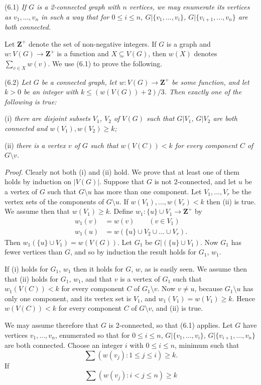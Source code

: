 \stmt
(6.1) \textit{If $G$ is a 2-connected graph with $n$ vertices, we may enumerate its vertices as $v_1, ..., v_n$ in such a way that for $0 \le i \le n$, $G|\{v_1, ..., v_i\}$, $G|\{v_{i+1}, ..., v_n\}$ are both connected.}

Let $\mathbf{Z}^+$ denote the set of non-negative integers. If $G$ is a graph and $w \colon V(G) \to \mathbf{Z}^+$ is a function and $X \subseteq V(G)$, then $w(X)$ denotes $\sum_{v \in X} w(v)$. We use (6.1) to prove the following.

\stmt
(6.2) \textit{Let $G$ be a connected graph, let $w \colon V(G) \to \mathbf{Z}^+$ be some function, and let $k > 0$ be an integer with $k \le (w(V(G)) + 2)/3$. Then exactly one of the following is true:}

\hspace*{12pt}(i) \textit{there are disjoint subsets $V_1$, $V_2$ of $V(G)$ such that $G|V_1$, $G|V_2$ are both connected and $w(V_1), w(V_2) \ge k$;}

\hspace*{12pt}(ii) \textit{there is a vertex $v$ of $G$ such that $w(V(C)) < k$ for every component $C$ of $G \setminus v$.}

\textit{Proof.} Clearly not both (i) and (ii) hold. We prove that at least one of them holds by induction on $|V(G)|$. Suppose that $G$ is not 2-connected, and let $u$ be a vertex of $G$ such that $G \setminus u$ has more than one component. Let $V_1, ..., V_r$ be the vertex sets of the components of $G \setminus u$. If $w(V_1), ..., w(V_r) < k$ then (ii) is true. We assume then that $w(V_1) \ge k$. Define $w_1 \colon \{u\} \cup V_1 \to \mathbf{Z}^+$ by
\begin{align*}
w_1(v) &= w(v) \qquad (v \in V_1) \\
w_1(u) &= w(\{u\} \cup V_2 \cup \dots \cup V_r).
\end{align*}
Then $w_1(\{u\} \cup V_1) = w(V(G))$. Let $G_1$ be $G|(\{u\} \cup V_1)$. Now $G_1$ has fewer vertices than $G$, and so by induction the result holds for $G_1$, $w_1$.

If (i) holds for $G_1$, $w_1$ then it holds for $G$, $w$, as is easily seen. We assume then that (ii) holds for $G_1$, $w_1$, and that $v$ is a vertex of $G_1$ such that $w_1(V(C)) < k$ for every component $C$ of $G_1 \setminus v$. Now $v \ne u$, because $G_1 \setminus u$ has only one component, and its vertex set is $V_1$, and $w_1(V_1) = w(V_1) \ge k$. Hence $w(V(C)) < k$ for every component $C$ of $G \setminus v$, and (ii) is true.

We may assume therefore that $G$ is 2-connected, so that (6.1) applies. Let $G$ have vertices $v_1, ..., v_n$, enumerated so that for $0 \le i \le n$, $G|\{v_1, ..., v_i\}$, $G|\{v_{i+1}, ..., v_n\}$ are both connected. Choose an integer $i$ with $0 \le i \le n$, minimum such that
\begin{equation*}
\sum (w(v_j) : 1 \le j \le i) \ge k.
\end{equation*}
If
\begin{equation*}
\sum (w(v_j) : i < j \le n) \ge k
\end{equation*}
